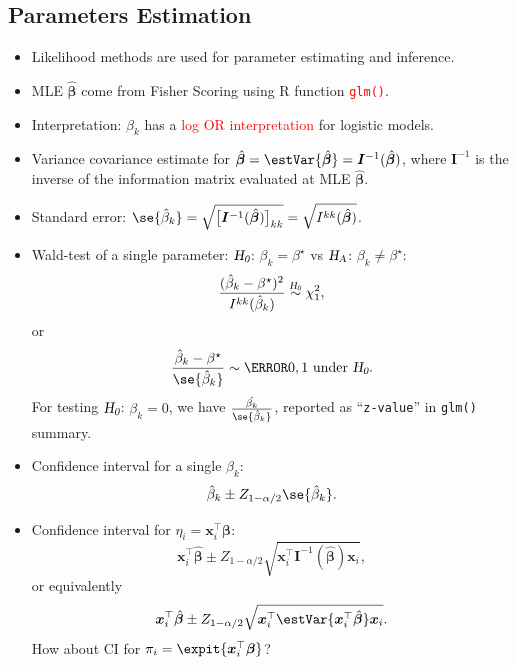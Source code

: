 \documentclass[oneside]{book}\usepackage[]{graphicx}\usepackage[svgnames]{xcolor}
\newcommand{\HN}{\textsl{H}_{\textsl{0}}}%
\newcommand{\HA}{\textsl{H}_{\textsl{A}}}%
\providecommand{\Vector}[1]{\bm{#1}}%
\providecommand{\Matrix}[1]{\bm{#1}}
\begin{document}
\subsection*{Parameters Estimation}
\begin{itemize}
      \item Likelihood methods are used for parameter estimating and inference.
      \item MLE $ \hat{\Vector{\beta}} $ come from Fisher Scoring using R function \textcolor{Red}{\texttt{glm()}}.
      \item Interpretation: $ \beta_k $ has a \textcolor{Red}{log OR interpretation} for logistic models.
      \item Variance covariance estimate for $ \hat{\Vector{\beta}}=\estVar{\hat{\Vector{\beta}}}=\Matrix{I}^{-1}(\hat{\Vector{\beta}}) $,
            where $ \Matrix{I}^{-1} $ is the inverse of the information matrix evaluated at MLE $ \hat{\Vector{\beta}} $.
      \item Standard error: $ \se{\hat{\beta}_k}=\sqrt{\bigl[\Matrix{I}^{-1}(\hat{\Vector{\beta}})\bigr]_{kk}}=\sqrt{I^{kk}(\hat{\Vector{\beta}})} $.
      \item Wald-test of a single parameter: $ \HN $: $ \beta_k=\beta^\star $ vs $ \HA $: $ \beta_k\ne \beta^\star $:
            \[ \frac{(\hat{\beta}_k-\beta^\star)^2}{I^{kk}(\hat{\beta}_k)}\stackrel{\HN}{\sim}\chi^2_1,  \]
            or
            \[ \frac{\hat{\beta}_k-\beta^\star}{\se{\hat{\beta}_k}}\sim \N{0,1}\text{ under $ \HN $}.  \]
            For testing $ \HN $: $ \beta_k=0 $, we have $ \frac{\hat{\beta_k}}{\se{\hat{\beta}_k}} $, reported as ``\texttt{z-value}'' in \texttt{glm()} summary.
      \item Confidence interval for a single $ \beta_k $:
            \[ \hat{\beta}_k\pm Z_{1-\alpha/2}\se{\hat{\beta}_k}. \]
      \item Confidence interval for $ \eta_i=\Vector{x}_i^\top \Vector{\beta} $:
            \[ \Vector{x}_i^\top \hat{\Vector{\beta}}\pm Z_{1-\alpha/2}\sqrt{\Vector{x}_i^\top \Matrix{I}^{-1}(\hat{\Vector{\beta}})\Vector{x}_i}, \]
            or equivalently
            \[ \Vector{x}_i^\top \hat{\Vector{\beta}}\pm Z_{1-\alpha/2}\sqrt{\Vector{x}_i^\top \estVar{\Vector{x}_i^\top \hat{\Vector{\beta}}}\Vector{x}_i}. \]
            How about CI for $ \pi_i=\expit{\Vector{x}_i^\top \Vector{\beta}} $?
\end{itemize}
\end{document}
